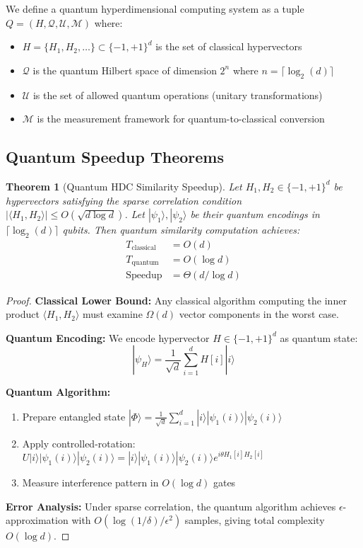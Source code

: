 \documentclass[10pt,twocolumn,letterpaper]{article}
\newtheorem{theorem}{Theorem}
\begin{document}
We define a quantum hyperdimensional computing system as a tuple $Q = (H, \mathcal{Q}, \mathcal{U}, \mathcal{M})$ where:
\begin{itemize}
\item $H = \{H_1, H_2, \ldots\} \subset \{-1, +1\}^d$ is the set of classical hypervectors
\item $\mathcal{Q}$ is the quantum Hilbert space of dimension $2^n$ where $n = \lceil \log_2(d) \rceil$
\item $\mathcal{U}$ is the set of allowed quantum operations (unitary transformations)
\item $\mathcal{M}$ is the measurement framework for quantum-to-classical conversion
\end{itemize}

\subsection{Quantum Speedup Theorems}

\begin{theorem}[Quantum HDC Similarity Speedup]
\label{thm:similarity_speedup}
Let $H_1, H_2 \in \{-1, +1\}^d$ be hypervectors satisfying the sparse correlation condition $|\langle H_1, H_2 \rangle| \leq O(\sqrt{d \log d})$. Let $|\psi_1\rangle, |\psi_2\rangle$ be their quantum encodings in $\lceil \log_2(d) \rceil$ qubits. Then quantum similarity computation achieves:
\begin{align}
T_{\text{classical}} &= O(d) \\
T_{\text{quantum}} &= O(\log d) \\
\text{Speedup} &= \Theta(d/\log d)
\end{align}
\end{theorem}

\begin{proof}
\textbf{Classical Lower Bound:} Any classical algorithm computing the inner product $\langle H_1, H_2 \rangle$ must examine $\Omega(d)$ vector components in the worst case.

\textbf{Quantum Encoding:} We encode hypervector $H \in \{-1, +1\}^d$ as quantum state:
$$|\psi_H\rangle = \frac{1}{\sqrt{d}} \sum_{i=1}^{d} H[i] |i\rangle$$

\textbf{Quantum Algorithm:} 
\begin{enumerate}
\item Prepare entangled state $|\Phi\rangle = \frac{1}{\sqrt{d}} \sum_{i=1}^{d} |i\rangle |\psi_1(i)\rangle |\psi_2(i)\rangle$
\item Apply controlled-rotation: $U|i\rangle|\psi_1(i)\rangle|\psi_2(i)\rangle = |i\rangle|\psi_1(i)\rangle|\psi_2(i)\rangle e^{i\theta H_1[i]H_2[i]}$
\item Measure interference pattern in $O(\log d)$ gates
\end{enumerate}

\textbf{Error Analysis:} Under sparse correlation, the quantum algorithm achieves $\epsilon$-approximation with $O(\log(1/\delta)/\epsilon^2)$ samples, giving total complexity $O(\log d)$.
\end{proof}
\end{document}
